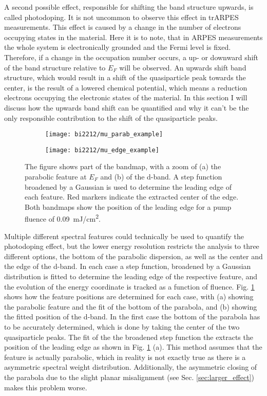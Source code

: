 A second possible effect, responsible for shifting the band structure upwards, is called photodoping.
It is not uncommon to observe this effect in trARPES measurements.
This effect is caused by a change in the number of electrons occupying states in the material.
Here it is to note, that in ARPES measurements the whole system is electronically grounded and the Fermi level is fixed.
Therefore, if a change in the occupation number occurs, a up- or downward shift of the band structure relative to $E_F$ will be observed.
An upwards shift band structure, which would result in a shift of the quasiparticle peak towards the center, is the result of a lowered chemical potential, which means a reduction electrons occupying the electronic states of the material.
In this section I will discuss how the upwards band shift can be quantified and why it can't be the only responsible contribution to the shift of the quasiparticle peaks.

\begin{figure}[b	!]
	\centering
	\begin{subfigure}[b]{0.27\textwidth}
		\texttt{[image: bi2212/mu\_parab\_example]}
		\caption{}
	\end{subfigure}
	\begin{subfigure}[b]{0.33\textwidth}
		\texttt{[image: bi2212/mu\_edge\_example]}
		\caption{}
	\end{subfigure}
	\caption{The figure shows part of the bandmap, with a zoom of (a) the parabolic feature at $E_F$ and (b) of the  d-band. A step function broadened by a Gaussian is used to determine the leading edge of each feature. Red markers indicate the extracted center of the edge. Both bandmaps show the position of the leading edge for a pump fluence of \qty{0.09}{\milli\joule/\centi\meter\squared}.}
	\label{fig:mu_center}
\end{figure}

Multiple different spectral features could technically be used to quantify the photodoping effect, but the lower energy resolution restricts the analysis to three different options, the bottom of the parabolic dispersion, as well as the center and the edge of the  d-band.
In each case a step function, broadened by a Gaussian distribution is fitted to determine the leading edge of the respective feature, and the evolution of the energy coordinate is tracked as a function of fluence.
Fig. \ref{fig:mu_center} shows how the feature positions are determined for each case, with (a) showing the parabolic feature and the fit of the bottom of the parabola, and (b) showing the fitted position of the  d-band.
In the first case the bottom of the parabola has to be accurately determined, which is done by taking the center of the two quasiparticle peaks.
The fit of the the broadened step function the extracts the position of the leading edge as shown in Fig. \ref{fig:mu_center} (a).
This method assumes that the feature is actually parabolic, which in reality is not exactly true as there is a asymmetric spectral weight distribution.
Additionally, the asymmetric closing of the parabola due to the slight planar misalignment (see Sec. \ref{sec:larger_effect}) makes this problem worse.

